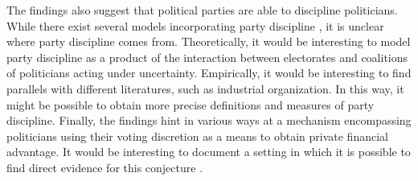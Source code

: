 The findings also suggest that political parties are able to discipline politicians. While there exist several models incorporating party discipline \citep{eguia2011voting, curto2018party}, it is unclear where party discipline comes from. Theoretically, it would be interesting to model party discipline as a product of the interaction between electorates and coalitions of politicians acting under uncertainty. Empirically, it would be interesting to find parallels with different literatures, such as industrial organization. In this way, it might be possible to obtain more precise definitions and measures of party discipline. Finally, the findings hint in various ways at a mechanism encompassing politicians using their voting discretion as a means to obtain private financial advantage. It would be interesting to document a setting in which it is possible to find direct evidence for this conjecture \citep[as in][]{tahoun2019personal}.


\clearpage




